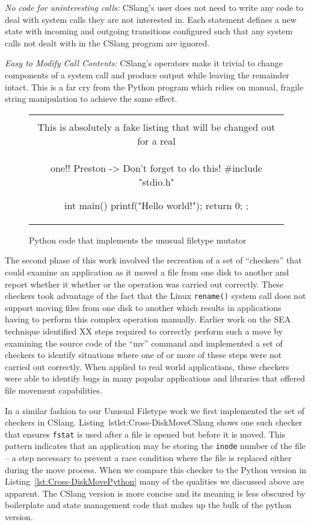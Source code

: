 \textit{No code for uninteresting calls:} CSlang's user does
not need to write any code to deal with system
calls they are not interested in.  Each statement defines a new state with
incoming and outgoing transitions configured such that any system calls not
dealt with in the CSlang program are ignored.

\textit{Easy to Modify Call Contents:}  CSlang's operators make it
trivial to change components of a system call
and produce output while leaving the remainder intact.  This is a far cry
from the Python program which relies on manual, fragile string manipulation
to achieve the same effect.


\begin{figure}[H]
\centering
\begin{tabular}{c}
\begin{lstlisting}
\\ This is absolutely a fake listing that will be changed out for a real
\\ one!!  Preston -> Don't forget to do this!
#include "stdio.h"

int main() {
    printf("Hello world!\n");
    return 0;
};
\end{lstlisting}
\end{tabular}
\caption{Python code that implements the unusual filetype mutator}
\label{lst:UnusualFiletypePython}
\end{figure}

The second phase of this work involved the recreation of a set of
``checkers'' that could examine an application as it moved a file from one
disk to another and report whether it whether or the operation was carried
out correctly.  These checkers took advantage of the fact that the Linux
{\tt rename()} system call does not support moving files from one disk to
another which results in applications having to perform this complex
operation manually.  Earlier work on the SEA technique
identified XX steps required to
correctly perform such a move by examining the source code of the ``mv''
command and implemented a set of checkers to identify situations where one
of or more of these steps were not carried out correctly.
When applied to real world applications,
these checkers were able to identify bugs
in many popular applications and libraries that offered file movement
capabilities.

In a similar fashion to our Unusual Filetype work we first implemented the
set of checkers in CSlang.  Listing~lst{lst:Cross-DiskMoveCSlang} shows one
such checker that ensures {\tt fstat} is used after a file is opened but
before it is moved.  This pattern indicates that an application may be
storing the {\tt inode} number of the file -- a step necessary to prevent a race
condition where the file is replaced either during the move process.  When
we compare this checker to the Python version in
Listing~\ref{lst:Cross-DiskMovePython} many of the qualities we discussed
above are apparent.  The CSlang version is more concise and its meaning is
less obscured by boilerplate and state management code that makes up the
bulk of the python version.

